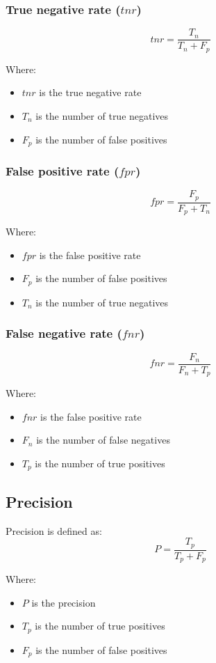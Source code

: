 \documentclass[11pt]{article}
\begin{document}
\subsubsection{True negative rate (\(tnr\))}
\label{sec:org00428f9}
\[tnr = \frac{T_n}{T_n + F_p}\]

Where:
\begin{itemize}
\item \(tnr\) is the true negative rate
\item \(T_n\) is the number of true negatives
\item \(F_p\) is the number of false positives
\end{itemize}
\subsubsection{False positive rate (\(fpr\))}
\label{sec:org74b075d}
\[fpr = \frac{F_p}{F_p + T_n}\]

Where:
\begin{itemize}
\item \(fpr\) is the false positive rate
\item \(F_p\) is the number of false positives
\item \(T_n\) is the number of true negatives
\end{itemize}
\subsubsection{False negative rate (\(fnr\))}
\label{sec:org3f336d2}
\[fnr = \frac{F_n}{F_n + T_p}\]

Where:
\begin{itemize}
\item \(fnr\) is the false positive rate
\item \(F_n\) is the number of false negatives
\item \(T_p\) is the number of true positives
\end{itemize}
\subsection{Precision}
\label{sec:org6574743}
Precision is defined as:
\[P = \frac{T_p}{T_p + F_p}\]

Where:
\begin{itemize}
\item \(P\) is the precision
\item \(T_p\) is the number of true positives
\item \(F_p\) is the number of false positives
\end{itemize}
\end{document}
